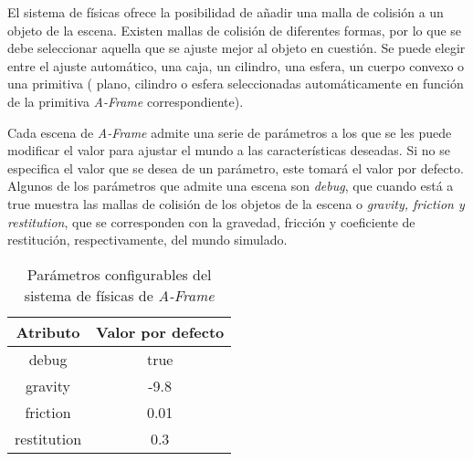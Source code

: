 El sistema de físicas ofrece la posibilidad de añadir una malla de colisión a un objeto de la escena. Existen mallas de colisión de diferentes formas, por lo que se debe seleccionar aquella que se ajuste mejor al objeto en cuestión. Se puede elegir entre el ajuste automático, una caja, un cilindro, una esfera, un cuerpo convexo o una primitiva ( plano, cilindro o esfera seleccionadas automáticamente en función de la primitiva \textit{A-Frame} correspondiente). \newline


Cada escena de  \textit{A-Frame}  admite una serie de parámetros a los que se les puede modificar el valor para ajustar el mundo a las características deseadas. Si no se especifica el valor que se desea de un parámetro, este tomará el valor por defecto. Algunos de los parámetros que admite una escena son \textit{debug}, que cuando está a true muestra las mallas de colisión de los objetos de la escena o \textit{gravity, friction y restitution}, que se corresponden con la gravedad, fricción y coeficiente de restitución, respectivamente, del mundo simulado.
\begin{table}[h!]
\centering
\begin{tabular}{|c|c|}
\hline
\textbf{Atributo}    & \textbf{Valor por defecto} \\ \hline
debug       & true              \\ \hline
gravity     & -9.8              \\ \hline
friction    & 0.01              \\ \hline
restitution & 0.3               \\ \hline
\end{tabular}
\caption{Parámetros configurables del sistema de físicas de \textit{A-Frame}}
\label{fig:param-fisicas}
\end{table}
